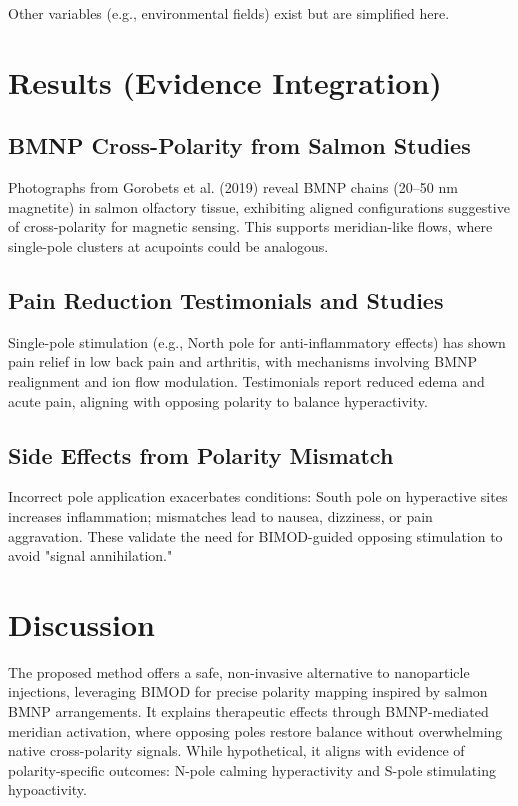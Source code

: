 \documentclass{article}
\begin{document}
Other variables (e.g., environmental fields) exist but are simplified here.

\section{Results (Evidence Integration)}
\subsection{BMNP Cross-Polarity from Salmon Studies}
Photographs from Gorobets et al. (2019) reveal BMNP chains (20–50 nm magnetite) in salmon olfactory tissue, exhibiting aligned configurations suggestive of cross-polarity for magnetic sensing\citep{gorobets2019}. This supports meridian-like flows, where single-pole clusters at acupoints could be analogous.

\subsection{Pain Reduction Testimonials and Studies}
Single-pole stimulation (e.g., North pole for anti-inflammatory effects) has shown pain relief in low back pain and arthritis, with mechanisms involving BMNP realignment and ion flow modulation\citep{elgohary2019, qmagnets2026, ebsco2026}. Testimonials report reduced edema and acute pain, aligning with opposing polarity to balance hyperactivity.

\subsection{Side Effects from Polarity Mismatch}
Incorrect pole application exacerbates conditions: South pole on hyperactive sites increases inflammation; mismatches lead to nausea, dizziness, or pain aggravation\citep{gluszko2024, medcentral2011, livescience2015}. These validate the need for BIMOD-guided opposing stimulation to avoid "signal annihilation."

\section{Discussion}
The proposed method offers a safe, non-invasive alternative to nanoparticle injections, leveraging BIMOD for precise polarity mapping inspired by salmon BMNP arrangements\citep{gorobets2019}. It explains therapeutic effects through BMNP-mediated meridian activation, where opposing poles restore balance without overwhelming native cross-polarity signals. While hypothetical, it aligns with evidence of polarity-specific outcomes: N-pole calming hyperactivity and S-pole stimulating hypoactivity\citep{colbert2008, clinicaltrials2019}.
\end{document}
